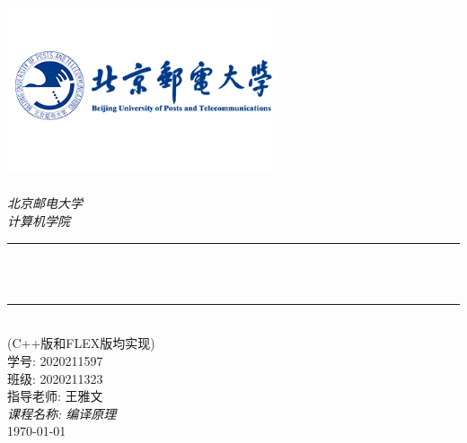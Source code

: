 \begin{titlepage}
    \newcommand{\HRule}{\rule{\linewidth}{0.5mm}}
    \includegraphics[width=8cm]{title/logo_bupt.png}\\[1cm]
    \center
    \quad\\[1.5cm]
    \textsl{\Large 北京邮电大学}\\[0.5cm]
    \textsl{\large  计算机学院}\\[0.5cm]
    \makeatletter
    \HRule \\[0.4cm]
    {\huge \bfseries \@title}\\[0.4cm]
    \HRule \\[1.5cm]
    \large {(C++版和FLEX版均实现)}\\[3cm]
    \makeatother
    {\large 学号: 2020211597}\\[0.5cm]
    {\large 班级: 2020211323}\\[0.5cm]
    {\large 指导老师: 王雅文}\\[0.5cm]
    {\large \emph{课程名称: 编译原理}}\\[0.5cm]
    {\large \today}\\[2cm]
    \vfill
\end{titlepage}

